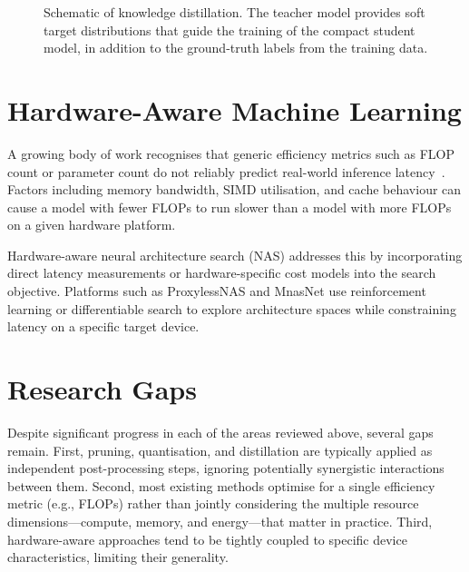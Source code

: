 \documentclass[12pt,a4paper,oneside]{book}
\begin{document}
\begin{figure}[htbp]
\centering
{}
\caption{Schematic of knowledge distillation. The teacher model provides
soft target distributions that guide the training of the compact student
model, in addition to the ground-truth labels from the training data.}
\label{fig:distillation}
\end{figure}

\section{Hardware-Aware Machine Learning}

A growing body of work recognises that generic efficiency metrics such
as FLOP count or parameter count do not reliably predict real-world
inference latency~\cite{devlin2019bert}. Factors including memory
bandwidth, SIMD utilisation, and cache behaviour can cause a model with
fewer FLOPs to run slower than a model with more FLOPs on a given
hardware platform.

Hardware-aware neural architecture search (NAS) addresses this by
incorporating direct latency measurements or hardware-specific cost
models into the search objective. Platforms such as ProxylessNAS and
MnasNet use reinforcement learning or differentiable search to explore
architecture spaces while constraining latency on a specific target
device.

\section{Research Gaps}

Despite significant progress in each of the areas reviewed above,
several gaps remain. First, pruning, quantisation, and distillation are
typically applied as independent post-processing steps, ignoring
potentially synergistic interactions between them. Second, most existing
methods optimise for a single efficiency metric (e.g., FLOPs) rather
than jointly considering the multiple resource dimensions---compute,
memory, and energy---that matter in practice. Third, hardware-aware
approaches tend to be tightly coupled to specific device
characteristics, limiting their generality.
\end{document}
